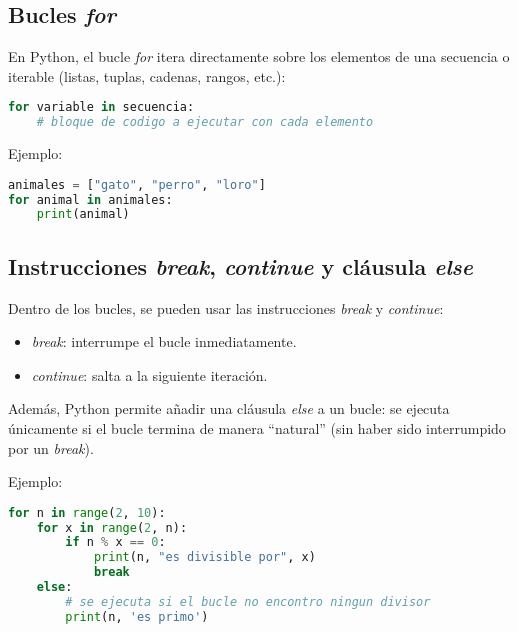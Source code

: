 
\subsection*{Bucles \textit{for}}

En Python, el bucle \textit{for} itera directamente sobre los elementos 
de una secuencia o iterable (listas, tuplas, cadenas, rangos, etc.):

\begin{lstlisting}[language=Python, caption={Estructura de bucle for.}]
for variable in secuencia:
    # bloque de codigo a ejecutar con cada elemento
\end{lstlisting}

Ejemplo:

\begin{lstlisting}[language=Python, caption={Ejemplo de bucle for.}]
animales = ["gato", "perro", "loro"]
for animal in animales:
    print(animal)
\end{lstlisting}

\subsection*{Instrucciones \textit{break}, \textit{continue} y cláusula \textit{else}}

Dentro de los bucles, se pueden usar las instrucciones \textit{break} 
y \textit{continue}:

\begin{itemize}
  \item \textit{break}: interrumpe el bucle inmediatamente.
  \item \textit{continue}: salta a la siguiente iteración.
\end{itemize}

Además, Python permite añadir una cláusula \textit{else} a un bucle:  
se ejecuta únicamente si el bucle termina de manera “natural” 
(sin haber sido interrumpido por un \textit{break}).

Ejemplo:

\begin{lstlisting}[language=Python, caption={Uso de break, continue y else en bucles.}]
for n in range(2, 10):
    for x in range(2, n):
        if n % x == 0:
            print(n, "es divisible por", x)
            break
    else:
        # se ejecuta si el bucle no encontro ningun divisor
        print(n, 'es primo')
\end{lstlisting}

